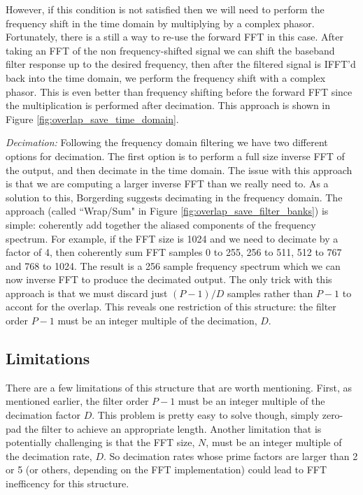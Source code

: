 \documentclass[12pt]{report}
\begin{document}
However, if this condition is not satisfied then we will need to perform the
frequency shift in the time domain by multiplying by a complex phasor.
Fortunately, there is a still a way to re-use the forward FFT in this case.
After taking an FFT of the non frequency-shifted signal we can shift the
baseband filter response up to the desired frequency, then after the filtered
signal is IFFT'd back into the time domain, we perform the frequency shift with
a complex phasor.  This is even better than frequency shifting before the
forward FFT since the multiplication is performed after decimation. This
approach is shown in Figure \ref{fig:overlap_save_time_domain}.

\emph{Decimation:} Following the frequency domain filtering we have two
different options for decimation. The first option is to perform a full size
inverse FFT of the output, and then decimate in the time domain. The issue with
this approach is that we are computing a larger inverse FFT than we really need
to. As a solution to this, Borgerding suggests decimating in the frequency
domain. The approach (called ``Wrap/Sum" in Figure
\ref{fig:overlap_save_filter_banks}) is simple: coherently add together the aliased
components of the frequency spectrum.  For example, if the FFT size is 1024 and
we need to decimate by a factor of 4, then coherently sum FFT samples 0 to 255,
256 to 511, 512 to 767 and 768 to 1024.  The result is a 256 sample frequency
spectrum which we can now inverse FFT to produce the decimated output. The only
trick with this approach is that we must discard just $(P-1)/D$ samples rather
than $P-1$ to accont for the overlap.  This reveals one restriction of this
structure: the filter order $P-1$ must be an integer multiple of the
decimation, $D$.

\subsection{Limitations}
\label{sec:os_limitations}
There are a few limitations of this structure that are worth mentioning. First,
as mentioned earlier, the filter order $P-1$ must be an integer multiple of the
decimation factor $D$. This problem is pretty easy to solve though, simply
zero-pad the filter to achieve an appropriate length. Another limitation that
is potentially challenging is that the FFT size, $N$, must be an integer
multiple of the decimation rate, $D$. So decimation rates whose prime factors
are larger than 2 or 5 (or others, depending on the FFT implementation) could
lead to FFT inefficency for this structure.
\end{document}
